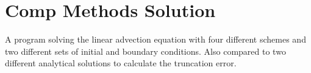 \chapter{Comp Methods Solution}
\hypertarget{md__r_e_a_d_m_e}{}\label{md__r_e_a_d_m_e}
\label{md__r_e_a_d_m_e_autotoc_md0}%
%


A program solving the linear advection equation with four different schemes and two different sets of initial and boundary conditions. Also compared to two different analytical solutions to calculate the truncation error. 